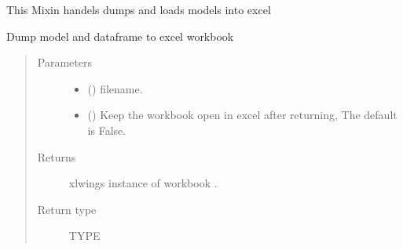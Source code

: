 \documentclass[letterpaper,10pt,english]{sphinxmanual}
\begin{document}
\begin{fulllineitems}
\label{\detokenize{index:modelclass.Excel_Mixin}}
\pysigstartsignatures
{}
\pysigstopsignatures
\sphinxAtStartPar
This Mixin handels dumps and loads models into excel

\begin{fulllineitems}
\label{\detokenize{index:modelclass.Excel_Mixin.modeldump_excel}}
\pysigstartsignatures
{}
\pysigstopsignatures
\sphinxAtStartPar
Dump model and dataframe to excel workbook
\begin{quote}\begin{description}
\item[{Parameters}] \leavevmode\begin{itemize}
\item {} 
\sphinxAtStartPar
{} () \textendash{} filename.

\item {} 
\sphinxAtStartPar
{} (\sphinxstyleliteralemphasis{\sphinxupquote{, }}) \textendash{} Keep the workbook open in excel after returning,  The default is False.

\end{itemize}

\item[{Returns}] \leavevmode
\sphinxAtStartPar
{} \textendash{} xlwings instance of workbook .

\item[{Return type}] \leavevmode
\sphinxAtStartPar
TYPE

\end{description}\end{quote}

\end{fulllineitems}


\end{fulllineitems}
\end{document}
